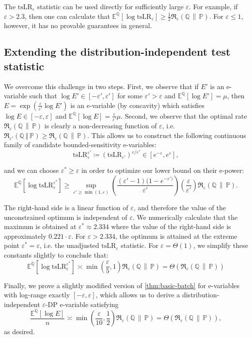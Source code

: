 \documentclass{article}
\newcommand{\Rdiv}[3][\eps]{%
  \mathfrak{R}_{#1}\!\left(#2\,\middle\|\,#3\right)%
}
\newcommand{\Null}{\mathbb{P}}
\newcommand{\E}{\mathbb{E}}
\newcommand{\Alt}{\mathbb{Q}}
\newcommand{\opt}{\Rdiv{\Alt}{\Null}}
\newcommand{\tsllr}{\text{tsLR}}
\newcommand{\eps}{\varepsilon}
\begin{document}
The $\tsllr_\eps$ statistic can be used directly for sufficiently large $\eps$. For example, if $\eps > 2.3$, then one can calculate that $\E^\Alt[\log \tsllr_\eps] \geq \frac{1}{2}\opt$. For $\eps \leq 1$, however, it has no provable guarantees in general. 

\subsection{Extending the distribution-independent test statistic}

We overcome this challenge in two steps. First, we observe that if $E'$ is an e-variable such that $\log E' \in [-\eps', \eps']$ for some $\eps' > \eps$ and $\E^\Alt[\log E'] = \mu$, then $E = \exp(\frac{\eps}{\eps'} \log E')$ is an e-variable (by concavity) which satisfies $\log E \in [-\eps, \eps]$ and $\E^\Alt[\log E] = \frac{\eps}{\eps'}\mu$. Second, we observe that the optimal rate $\opt$ is clearly a non-decreasing function of $\eps$, i.e. $\mathfrak{R}_{\eps'}(\Alt~\Vert~\Null) \geq \opt$. This allows us to construct the following continuous family of candidate bounded-sensitivity e-variables:
\begin{equation*}
    \tsllr_\eps^{\eps'} \coloneq (\tsllr_{\eps'})^{\eps/\eps'} \in [e^{-\eps}, e^\eps],
\end{equation*}

and we can choose $\eps^* \geq \eps$ in order to optimize our lower bound on their e-power:
\begin{equation*}
    \E^\Alt[\log \tsllr_\eps^{\eps^*}] \geq \sup_{\eps' \geq \min(1,\eps)} \left(\frac{(\eps'-1)(1-e^{-{\eps'})}} {\eps'}\right)\left(\frac{\eps}{\eps'}\right) \opt.
\end{equation*}

The right-hand side is a linear function of $\eps$, and therefore the value of the unconstrained optimum is independent of $\eps$. We numerically calculate that the maximum is obtained at $\eps^* \approx 2.334$ where the value of the right-hand side is approximately $0.221 \cdot \eps$. For $\eps > 2.334$, the optimum is attained at the extreme point $\eps^* = \eps$, i.e. the unadjusted $\tsllr_\eps$ statistic. For $\eps = \Theta(1)$, we simplify these constants slightly to conclude that:
\begin{equation*}
    \E^\Alt[\log \tsllr_\eps^{\eps^*}] \asymp \min\left( \frac{\eps}{5},1 \right)\opt = \Theta(\opt)
\end{equation*}

Finally, we prove a slightly modified version of \cref{thm:basic-batch} for e-variables with log-range exactly $[-\eps, \eps]$, which allows us to derive a distribution-independent $\eps$-DP e-variable satisfying 
\begin{equation*}
    \frac{\E^\Alt[\log E]}{n} \asymp \min\left(\frac{\eps}{10}, \frac{1}{2}\right) \opt = \Theta(\opt),
\end{equation*}
as desired.
\end{document}
